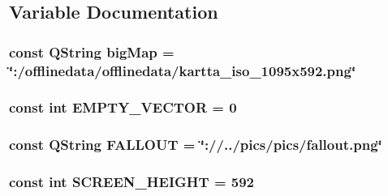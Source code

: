 \subsection{Variable Documentation}
\hypertarget{gameengine_8hh_ad6494001dd20d6bedc7543fec6c695ba}{
\subsubsection[{big\-Map}]{\setlength{\rightskip}{0pt plus 5cm}const Q\-String big\-Map = \char`\"{}\-:/offlinedata/offlinedata/kartta\-\_\-iso\-\_\-1095x592.\-png\char`\"{}}}\label{gameengine_8hh_ad6494001dd20d6bedc7543fec6c695ba}
\hypertarget{gameengine_8hh_a8d5e08c7b38927d44080edc754c38548}{
\subsubsection[{E\-M\-P\-T\-Y\-\_\-\-V\-E\-C\-T\-O\-R}]{\setlength{\rightskip}{0pt plus 5cm}const int E\-M\-P\-T\-Y\-\_\-\-V\-E\-C\-T\-O\-R = 0}}\label{gameengine_8hh_a8d5e08c7b38927d44080edc754c38548}
\hypertarget{gameengine_8hh_aa00341459be5e91d4cfc88f9c6e60e1b}{
\subsubsection[{F\-A\-L\-L\-O\-U\-T}]{\setlength{\rightskip}{0pt plus 5cm}const Q\-String F\-A\-L\-L\-O\-U\-T = \char`\"{}\-://../pics/pics/fallout.\-png\char`\"{}}}\label{gameengine_8hh_aa00341459be5e91d4cfc88f9c6e60e1b}
\hypertarget{gameengine_8hh_ab454541ae58bcf6555e8d723b1eb95e7}{
\subsubsection[{S\-C\-R\-E\-E\-N\-\_\-\-H\-E\-I\-G\-H\-T}]{\setlength{\rightskip}{0pt plus 5cm}const int S\-C\-R\-E\-E\-N\-\_\-\-H\-E\-I\-G\-H\-T = 592}}\label{gameengine_8hh_ab454541ae58bcf6555e8d723b1eb95e7}
